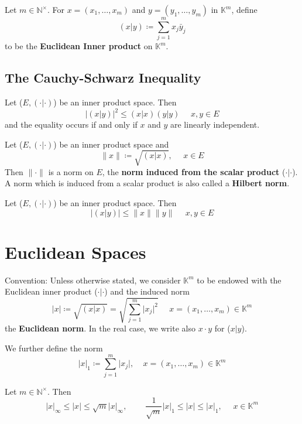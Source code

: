 Let \(m \in \mathbb{N}^\times\). For \(x = \left(x_1,\ldots,x_m\right)\) and 
\(y = \left(y_1,\ldots,y_m\right)\) in \(\mathbb{K}^m\), define
\[
    (x|y) \coloneqq \sum^m_{j=1} x_j \bar{y}_j   
\]
to be the \textbf{Euclidean Inner product} on \(\mathbb{K}^m\). 

\subsection*{The Cauchy-Schwarz Inequality}

\begin{theorem}\label{theorem: Cauchy-Schwarz}
    Let (\(E, \left(\cdot|\cdot\right)\)) be an inner product space. Then
    \[
        \lvert (x|y) \rvert^2  \leq (x|x)(y|y) \:\:\:\:\:\: x,y \in E   
    \]
    and the equality occurs if and only if \(x\) and \(y\) are linearly independent.
\end{theorem}

\begin{theorem}
    Let (\(E, \left(\cdot|\cdot\right)\)) be an inner product space and 
    \[
        \lVert x \rVert \coloneqq \sqrt{(x|x)}, \:\:\:\:\:\: x\in E  
    \]
    Then \(\lVert \cdot \rVert\) is a norm on \(E\), the \textbf{norm induced from
    the scalar product} (\(\cdot | \cdot\)). 
    A norm which is induced from a scalar product is also called a \textbf{Hilbert norm}. 
\end{theorem}

\begin{corollary}
    Let (\(E, \left(\cdot|\cdot\right)\)) be an inner product space. Then
    \[
        \lvert (x|y) \rvert \leq \lVert x \rVert \lVert y\rVert \:\:\:\:\:\: x,y \in E
    \]
\end{corollary}

\section{Euclidean Spaces}

Convention: Unless otherwise stated, we consider \(\mathbb{K}^m\) to be endowed with 
the Euclidean inner product (\(\cdot|\cdot\)) and the induced norm
\[
    \lvert x \rvert \coloneqq \sqrt{(x|x)} = \sqrt{\sum^m_{j=1}\lvert x_j\rvert^2}
    \:\:\:\:\:\: x = (x_1,\ldots,x_m) \in \mathbb{K}^m 
\]
the \textbf{Euclidean norm}. In the real case, we write also \(x \cdot y\) for (\(x|y\)). 

We further define the norm 
\[
    \lvert x \rvert_1 \coloneqq \sum^m_{j=1} \lvert x_j \rvert , \:\:\:\:\: x = (x_1,\ldots,x_m)\in \mathbb{K}^m  
\]
\begin{proposition}
    Let \(m \in \mathbb{N}^\times\). Then 
    \[
        \lvert x \rvert_\infty \leq \lvert x \rvert \leq \sqrt{m} \lvert x \rvert_\infty
        , \:\:\:\:\:\:\:\:\:\: \frac{1}{\sqrt{m}}\lvert x \rvert_1 \leq \lvert x \rvert
        \leq \lvert x \rvert_1, \:\:\:\:\:\: x \in \mathbb{K}^m   
    \]
\end{proposition}

